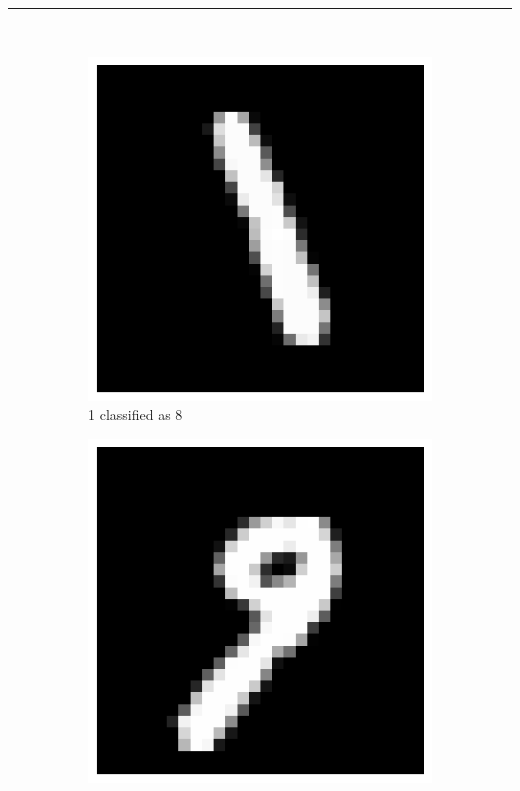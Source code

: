 \documentclass{article}
\begin{document}
\noindent\rule{\textwidth}{0.4pt}\\
\begin{figure}[H]
    \centering
    \begin{subfigure}[b]{0.3\textwidth}
        \centering
        \includegraphics[width=\textwidth]{digit1.png}
        \caption{1 classified as 8}
        \label{fig:digit1}
    \end{subfigure}
    \hfill
    \begin{subfigure}[b]{0.3\textwidth}
        \centering
        \includegraphics[width=\textwidth]{digit2.png}

\end{subfigure}
\end{figure}
\end{document}
